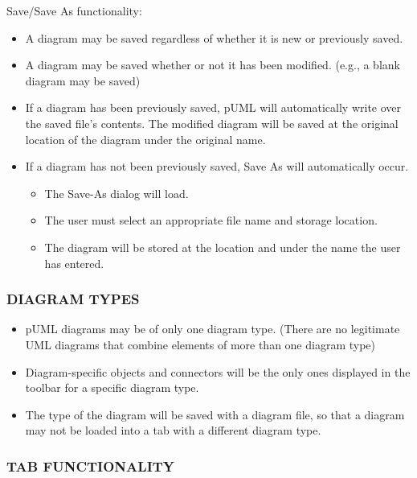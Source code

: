 \documentclass[twoside,letterpaper]{article}
\begin{document}
{Save/Save As functionality:
\newline
{
\begin{itemize}
\item A diagram may be saved regardless of whether it is new or previously saved.
\item A diagram may be saved whether or not it has been modified. (e.g., a blank diagram may be saved)
\item If a diagram has been previously saved, pUML will automatically write over the saved file's contents. The modified diagram will be saved at the original location of the diagram under the original name.
\item If a diagram has not been previously saved, Save As will automatically occur.
\begin{itemize}
\item The Save-As dialog will load.
\item The user must select an appropriate file name and storage location. 
\item The diagram will be stored at the location and under the name the user has entered.
\end{itemize}
\end{itemize}
}

\bigskip


\subsubsection[DIAGRAM TYPES]{\bfseries DIAGRAM TYPES}

\begin{itemize}
\item pUML diagrams may be of only one diagram type. (There are no legitimate UML diagrams that combine elements of more than one diagram type)
\item Diagram-specific objects and connectors will be the only ones displayed in the toolbar for a specific diagram type.
\item The type of the diagram will be saved with a diagram file, so that a diagram may not be loaded into a tab with a different diagram type.
\end{itemize}


\bigskip

\subsubsection[TAB FUNCTIONALITY]{\bfseries TAB FUNCTIONALITY}

}
\end{document}
